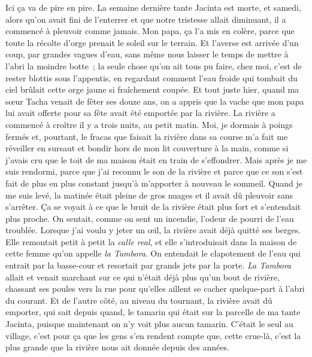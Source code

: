 	Ici ça va de pire en pire. La semaine dernière tante Jacinta est morte, et samedi, alors qu’on avait fini de l’enterrer et que notre tristesse allait diminuant, il a commencé à pleuvoir comme jamais. Mon papa, ça l’a mis en colère, parce que toute la récolte d’orge prenait le soleil sur le terrain. Et l’averse est arrivée d’un coup, par grandes vagues d’eau, sans même nous laisser le temps de mettre à l’abri la moindre botte ; la seule chose qu'on ait tous pu faire, chez moi, c’est de rester blottis sous l’appentis, en regardant comment l’eau froide qui tombait du ciel brûlait cette orge jaune si fraîchement coupée.
\pend
%
\pstart
	Et tout juste hier, quand ma sœur Tacha venait de fêter ses douze ans, on a appris que la vache que mon papa lui avait offerte pour sa fête avait été emportée par la rivière.
\pend
%
\pstart
	La rivière a commencé à croître il y a trois nuits, au petit matin. Moi, je dormais à poings fermés et, pourtant, le fracas que faisait la rivière dans sa course m’a fait me réveiller en sursaut et bondir hors de mon lit couverture à la main, comme si j’avais cru que le toit de ma maison était en train de s’effondrer. Mais après je me suis rendormi, parce que j’ai reconnu le son de la rivière et parce que ce son s’est fait de plus en plus constant jusqu’à m’apporter à nouveau le sommeil.
\pend
%
\pstart
	Quand je me suis levé, la matinée était pleine de gros nuages et il avait dû pleuvoir sans s’arrêter. Ça se voyait à ce que le bruit de la rivière était plus fort et s’entendait plus proche. On sentait, comme on sent un incendie, l’odeur de pourri de l’eau troublée.
\pend
%
\pstart
	Lorsque j’ai voulu y jeter un œil, la rivière avait déjà quitté ses berges. Elle remontait petit à petit la \textit{calle real}, et elle s’introduisait dans la maison de cette femme qu’on appelle \textit{la Tambora}. On entendait le clapotement de l’eau qui entrait par la basse-cour et resortait par grands jets par la porte. \textit{La Tambora} allait et venait marchant sur ce qui n’était déjà plus qu’un bout de rivière, chassant ses poules vers la rue pour qu’elles aillent se cacher quelque-part à l’abri du courant.
\pend
%
\pstart
	Et de l’autre côté, au niveau du tournant, la rivière avait dû emporter, qui sait depuis quand, le tamarin qui était sur la parcelle de ma tante Jacinta, puisque maintenant on n’y voit plus aucun tamarin. C’était le seul au village, c’est pour ça que les gens s’en rendent compte que, cette crue-là, c’est la plus grande que la rivière nous ait donnée depuis des années.
